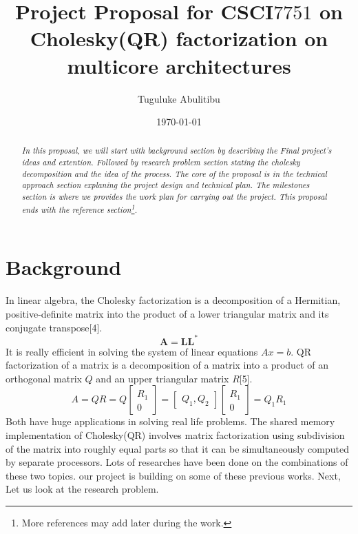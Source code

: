 \documentclass{article}
\title{Project Proposal for CSCI$7751$ on Cholesky(QR)
factorization on multicore architectures }
\author{Tuguluke Abulitibu}
\date{\today}
\begin{document}
\maketitle


\begin{abstract}
\emph{
In this proposal, we will start with background section by describing the Final project's ideas and extention. Followed by research problem section stating the cholesky decomposition and the idea of the process. The core of the proposal is in the technical approach section explaning the project design and technical plan. The milestones section is where we provides the work plan for carrying out the project. This proposal ends with the reference section\footnote{More references may add later during the work.}.
}
\end{abstract}

\iffalse
1. The background section can be omitted unless your project is building on
previous work. If it is doing that, you need to refer to the work, describe it,
and say how you’re extending it. What are the new ideas?
2. Begin with a research problem section. State the technical problem you
intend to solve. Indicate how it might be useful. This can be brief; it is just
an introduction to the next section.
3. The technical approach section. This is the core of the proposal. It’s where
you spell out your technical plan and explain the project design. Evaluation
issues would also be addressed in this section.
4. The milestones section provides a work plan for carrying out the project.
This is your schedule for getting the project done.
5. The references section mentions any references you’ll use, and sources for
data, software, and other materials.
\fi

\section{Background}
In linear algebra, the Cholesky factorization is a decomposition of a Hermitian, positive-definite matrix into the product of a lower triangular matrix and its conjugate transpose[4]. 
\[\mathbf{A = L L}^{*}\]
It is really efficient in solving the system of linear equations $Ax = b$. 
 QR factorization of a matrix is a decomposition of a matrix into a product of an orthogonal matrix $Q$ and an upper triangular matrix $R$[5]. 
\[
A = QR = Q \begin{bmatrix} R_1 \\ 0 \end{bmatrix}
  =  \begin{bmatrix} Q_1, Q_2 \end{bmatrix} \begin{bmatrix} R_1 \\ 0 \end{bmatrix}
  = Q_1 R_1 
\]
Both have huge applications in solving real life problems.  The shared memory
implementation of Cholesky(QR) involves  matrix factorization using subdivision of the matrix into
roughly equal parts so that it can be simultaneously computed by separate processors. Lots of researches have been done on the combinations of these two topics. our project is building on some of these previous works. Next, Let us look at the research problem.
\end{document}
